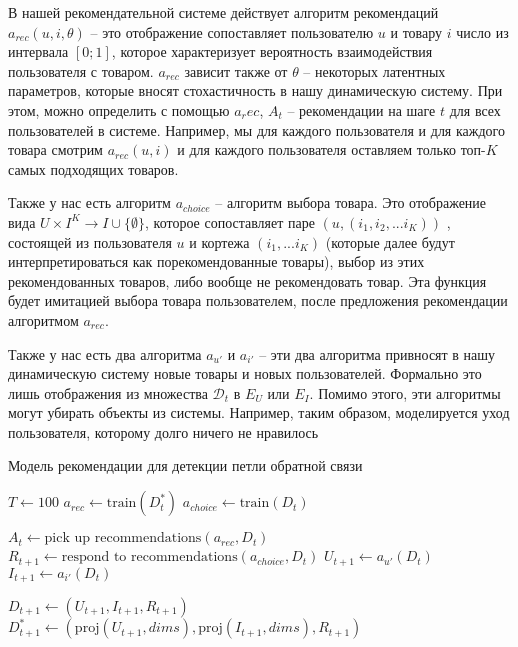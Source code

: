 \documentclass{article}
\begin{document}
В нашей рекомендательной системе действует алгоритм рекомендаций $a_{rec}(u, i, \theta)$ – это отображение сопоставляет пользователю $u$ и товару $i$ число из интервала $[0; 1]$, которое характеризует вероятность взаимодействия пользователя с товаром. $a_{rec}$ зависит также от $\theta$ – некоторых латентных параметров, которые вносят стохастичность в нашу динамическую систему. При этом, можно определить с помощью $a_rec$, $A_t$ – рекомендации на шаге $t$ для всех пользователей в системе. Например, мы для каждого пользователя и для каждого товара смотрим $a_{rec}(u, i)$ и для каждого пользователя оставляем только топ-$K$ самых подходящих товаров. 

Также у нас есть алгоритм $a_{choice}$ – алгоритм выбора товара. Это отображение вида $U \times I^K \rightarrow I  \cup \{ \emptyset \}$, которое сопоставляет паре $(u, (i_1, i_2, ... i_K))$ , состоящей из пользователя $u$ и кортежа $(i_1, ... i_K)$ (которые далее будут интерпретироваться как порекомендованные товары), выбор из этих рекомендованных товаров, либо вообще не рекомендовать товар. Эта функция будет имитацией выбора товара пользователем, после предложения рекомендации алгоритмом $a_{rec}$. 

Также у нас есть два алгоритма $a_{u'}$ и $a_{i'}$ – эти два алгоритма привносят в нашу динамическую систему новые товары и новых пользователей. Формально это лишь отображения из множества $\mathscr{D}_t$ в $E_U$ или $E_I$. Помимо этого, эти алгоритмы могут убирать объекты из системы. Например, таким образом, моделируется уход пользователя, которому долго ничего не нравилось




\begin{algorithm}
\caption{Модель рекомендации для детекции петли обратной связи}\label{one_exp}
\begin{algorithmic}[1]
\State $T \gets 100$ 
\State $a_{rec} \gets \text{train}(D_t^*)$ 
\State $a_{choice} \gets \text{train}(D_t)$

\State $A_t \gets \text{pick up recommendations}(a_{rec}, D_t)$ 
\State $R_{t+1} \gets \text{respond to recommendations}(a_{choice}, D_t)$
\State $U_{t+1} \gets a_{u'}(D_t)$ 
\State $I_{t+1} \gets a_{i'}(D_t)$ 

\State $D_{t+1} \gets (U_{t+1}, I_{t+1}, R_{t+1})$ 
\State $D_{t+1}^* \gets (\text{proj}(U_{t+1}, dims), \text{proj}(I_{t+1}, dims), R_{t+1})$ 
\EndWhile

\end{algorithmic}
\end{algorithm}
\end{document}
